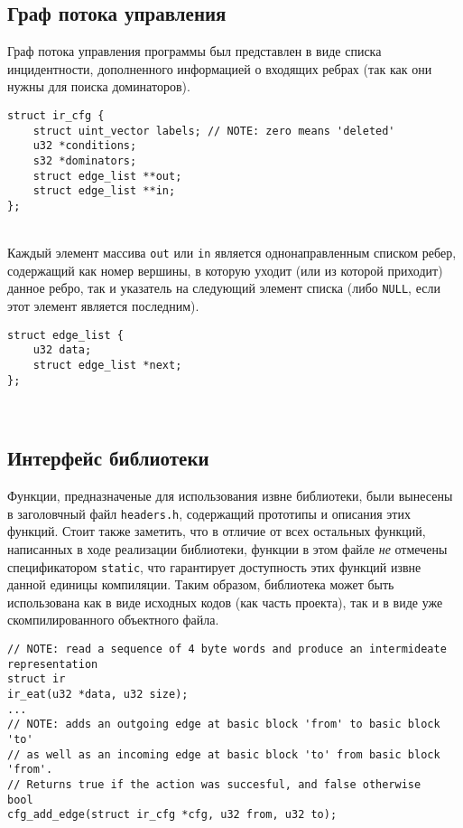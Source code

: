 \documentclass[14pt]{extarticle}
\begin{document}
\subsection{Граф потока управления}
Граф потока управления программы был представлен в виде списка инцидентности, дополненного информацией о входящих ребрах (так как они нужны для поиска доминаторов).
\begin{lstlisting}[caption={структура графа потока управления}]
struct ir_cfg {
    struct uint_vector labels; // NOTE: zero means 'deleted'
    u32 *conditions;
    s32 *dominators;
    struct edge_list **out;
    struct edge_list **in;
};
\end{lstlisting}
~\\ %

Каждый элемент массива \texttt{out} или \texttt{in} является однонаправленным списком ребер, содержащий как номер вершины, в которую уходит (или из которой приходит) данное ребро, так и указатель на следующий элемент списка (либо \texttt{NULL}, если этот элемент является последним).
\begin{lstlisting}[caption={элемент списка ребер}]
struct edge_list {
    u32 data;
    struct edge_list *next;
};
\end{lstlisting}
~\\ %

\subsection{Интерфейс библиотеки}
Функции, предназначеные для использования извне библиотеки, были вынесены в заголовчный файл \texttt{headers.h}, содержащий прототипы и описания этих функций. Стоит также заметить, что в отличие от всех остальных функций, написанных в ходе реализации библиотеки, функции в этом файле \emph{не} отмечены спецификатором \texttt{static}, что гарантирует доступность этих функций извне данной единицы компиляции. Таким образом, библиотека может быть использована как в виде исходных кодов (как часть проекта), так и в виде уже скомпилированного объектного файла.
\begin{lstlisting}[caption={пример функций из заголовочного файла \texttt{headers.h}}]
// NOTE: read a sequence of 4 byte words and produce an intermideate representation
struct ir 
ir_eat(u32 *data, u32 size);
...
// NOTE: adds an outgoing edge at basic block 'from' to basic block 'to'
// as well as an incoming edge at basic block 'to' from basic block 'from'.
// Returns true if the action was succesful, and false otherwise
bool 
cfg_add_edge(struct ir_cfg *cfg, u32 from, u32 to);
\end{lstlisting}
~\\ %
\end{document}
